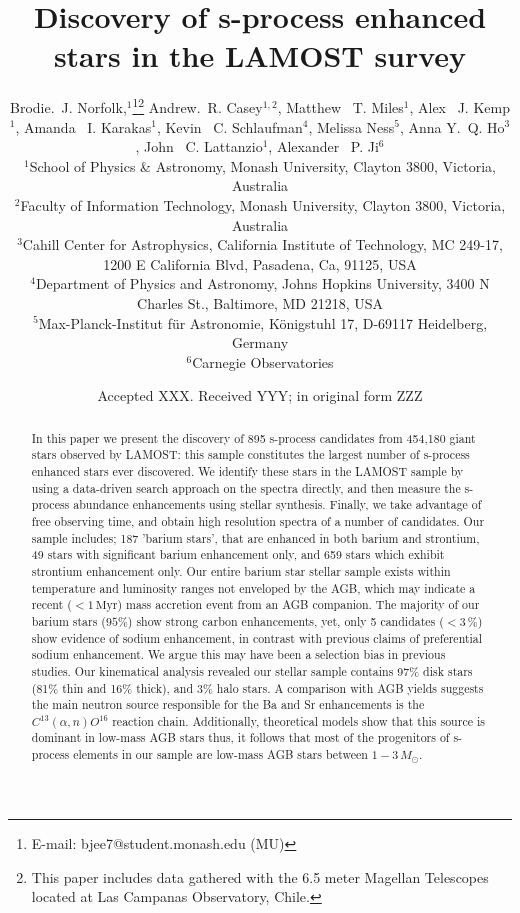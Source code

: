 \documentclass[a4paper,fleqn,usenatbib]{mnras}
\title[S-process stars in LAMOST]{Discovery of s-process enhanced stars in the LAMOST survey}
\author[Brodie.~J. Norfolk et al.]{Brodie.~J. Norfolk,$^{1}$\thanks{E-mail: bjee7@student.monash.edu (MU)}\thanks{This paper includes data gathered with the 6.5 meter Magellan Telescopes located at Las Campanas Observatory, Chile.}
Andrew.~R. Casey$^{1,2}$,
Matthew ~T. Miles$^{1}$,
Alex ~J. Kemp$^{1}$, \newauthor
Amanda ~I. Karakas$^{1}$,
Kevin ~C. Schlaufman$^{4}$,
Melissa Ness$^{5}$,
Anna Y.~Q. Ho$^{3}$, \newauthor
John ~C. Lattanzio$^{1}$, 
Alexander ~P. Ji$^{6}$
\\
$^{1}$School of Physics \& Astronomy, Monash University, Clayton 3800, Victoria, Australia\\
$^{2}$Faculty of Information Technology, Monash University, Clayton 3800, Victoria, Australia\\
$^{3}$Cahill Center for Astrophysics, California Institute of Technology, MC 249-17, 1200 E California Blvd, Pasadena, Ca, 91125, USA\\
$^{4}$Department of Physics and Astronomy, Johns Hopkins University, 3400 N Charles St., Baltimore, MD 21218, USA
\\
$^{5}$Max-Planck-Institut f\"ur Astronomie, K\"onigstuhl 17, D-69117 Heidelberg, Germany
\\
$^{6}$Carnegie Observatories
}
\date{Accepted XXX. Received YYY; in original form ZZZ}
\begin{document}
\label{firstpage}
\pagerange{\pageref{firstpage}--\pageref{lastpage}}
\maketitle

\begin{abstract}

In this paper we present the discovery of 895 s-process candidates from 454,180 giant stars observed by LAMOST: this sample constitutes the largest number of s-process enhanced stars ever discovered. We identify these stars in the LAMOST sample by using a data-driven search approach on the spectra directly, and then measure the s-process abundance enhancements using stellar synthesis. Finally, we take advantage of free observing time, and obtain high resolution spectra of a number of candidates. Our sample includes; 187 'barium stars', that are enhanced in both barium and strontium, 49 stars with significant barium enhancement only, and 659 stars which exhibit strontium enhancement only. Our entire barium star stellar sample exists within temperature and luminosity ranges not enveloped by the AGB, which may indicate a recent ($<1\,\textrm{Myr}$) mass accretion event from an AGB companion. The majority of our barium stars ($95\%$) show strong carbon enhancements, yet, only 5 candidates ($<3$\,\%) show evidence of sodium enhancement, in contrast with previous claims of preferential sodium enhancement. We argue this may have been a selection bias in previous studies. Our kinematical analysis revealed our stellar sample contains 97\% disk stars (81\% thin and 16\% thick), and 3\% halo stars. A comparison with AGB yields suggests the main neutron source responsible for the Ba and Sr enhancements is the $C^{13}(\alpha,n)O^{16}$ reaction chain. Additionally, theoretical models show that this source is dominant in low-mass AGB stars thus, it follows that most of the progenitors of s-process elements in our sample are low-mass AGB stars between $1 - 3\,M_{\odot}$. 



\end{abstract}
\end{document}
